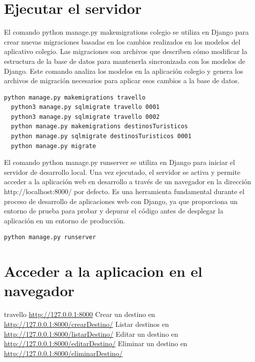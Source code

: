 \documentclass[10pt, a4paper]{article}
\begin{document}
\section{Ejecutar el servidor}
El comando python manage.py makemigrations colegio se utiliza en Django para crear nuevas migraciones basadas en los cambios realizados en los modelos del aplicativo colegio. Las migraciones son archivos que describen cómo modificar la estructura de la base de datos para mantenerla sincronizada con los modelos de Django. Este comando analiza los modelos en la aplicación colegio y genera los archivos de migración necesarios para aplicar esos cambios a la base de datos.
\begin{lstlisting}[language=bash]
  python manage.py makemigrations travello
  python3 manage.py sqlmigrate travello 0001
  python3 manage.py sqlmigrate travello 0002
  python manage.py makemigrations destinosTuristicos
  python manage.py sqlmigrate destinosTuristicos 0001
  python manage.py migrate
\end{lstlisting}

El comando python manage.py runserver se utiliza en Django para iniciar el servidor de desarrollo local. Una vez ejecutado, el servidor se activa y permite acceder a la aplicación web en desarrollo a través de un navegador en la dirección http://localhost:8000/ por defecto. Es una herramienta fundamental durante el proceso de desarrollo de aplicaciones web con Django, ya que proporciona un entorno de prueba para probar y depurar el código antes de desplegar la aplicación en un entorno de producción.
\begin{lstlisting}[language=bash]
  python manage.py runserver
\end{lstlisting}

\section{Acceder a la aplicacion en el navegador}
travello \href{http://127.0.0.1:8000}{http://127.0.0.1:8000}
\singlespacing
Crear un destino en \href{http://127.0.0.1:8000/crearDestino/}{http://127.0.0.1:8000/crearDestino/}
\singlespacing
Listar destinos en \href{http://127.0.0.1:8000/listarDestino/}{http://127.0.0.1:8000/listarDestino/}
\singlespacing
Editar un destino en \href{http://127.0.0.1:8000/editarDestino/}{http://127.0.0.1:8000/editarDestino/}
\singlespacing
Eliminar un destino en \href{http://127.0.0.1:8000/eliminarDestino/}{http://127.0.0.1:8000/eliminarDestino/}
\end{document}
